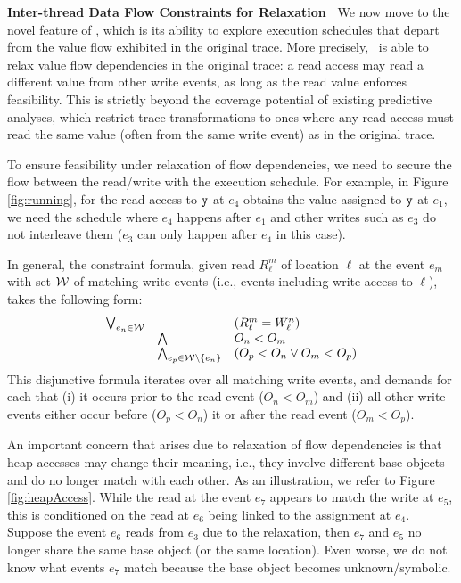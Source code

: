 {\bf Inter-thread Data Flow Constraints for Relaxation\ } We now move to the novel feature of \tool, which is its ability to explore execution schedules that depart from the value flow exhibited in the original trace. More precisely, \tool\ is able to relax value flow dependencies in the original trace:  a read access may read a
different value from other write events, as long as the read value enforces feasibility.
 This is strictly beyond the coverage potential of existing predictive analyses, which restrict trace transformations to ones where any read access must read the same  value (often from the same write event) as in the original trace. 

To ensure feasibility under relaxation of flow dependencies, we need to secure the flow between the read/write with the execution schedule. 
For example, in Figure \ref{fig:running}, for the read access to ${\tt y}$ at $e_4$ obtains the value assigned to ${\tt y}$ at $e_1$, we need the schedule where 
$e_4$ happens after $e_1$ and other writes such as $e_3$ do not interleave them ($e_3$ can only happen after $e_4$ in this case).



In general, the constraint formula, given read $R^{m}_{\ell}$ of location $\ell$ at the event $e_m$ with set ${\cal W}$ of matching write events (i.e., events including write access to $\ell$), takes the following form:
$$
\begin{array}{rll}
\bigvee_{e_n \in {\cal W}} &  & (R^{m}_{\ell} = W^{n}_{\ell}) \\
&		\bigwedge 	&  O_n < O_m \\
&		\bigwedge_{e_p \in {\cal W} \setminus \{ e_n \}} & (O_p < O_n \vee O_m < O_p)
\end{array}
$$
This disjunctive formula iterates over all matching write events, and demands for each that (i) it occurs prior to the read event ($O_n < O_m$) and (ii) all other write events either occur before ($O_p < O_n$) it or after the read event
($O_m < O_p$).

An important concern that arises due to relaxation of flow dependencies is that heap accesses may change their meaning, i.e., they involve different base objects and do no longer match with each other. As an illustration, we refer to Figure \ref{fig:heapAccess}. While the read at the event $e_7$ appears to match the write at $e_5$, this is conditioned on the read at $e_6$ being linked to the assignment at $e_4$. Suppose  the event $e_6$ reads from $e_3$ due to the relaxation, then $e_7$ and $e_5$ no longer share the same base object (or the same location). Even worse, we do not know what events $e_7$ match because the base object becomes unknown/symbolic.



